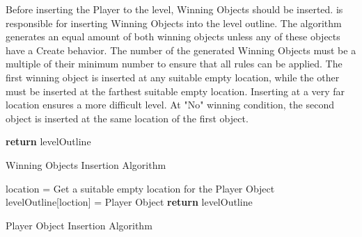 Before inserting the Player to the level, Winning Objects should be inserted.  is responsible for inserting Winning Objects into the level outline. The algorithm generates an equal amount of both winning objects unless any of these objects have a Create behavior. The number of the generated Winning Objects must be a multiple of their minimum number to ensure that all rules can be applied. The first winning object is inserted at any suitable empty location, while the other must be inserted at the farthest suitable empty location. Inserting at a very far location ensures a more difficult level. At "No" winning condition, the second object is inserted at the same location of the first object.\\

\begin{algorithm}[H]
	\BlankLine
	\BlankLine
	\BlankLine
	\textbf{return} levelOutline\;
	\caption{Winning Objects Insertion Algorithm}
	\label{Algorithm:winningObjects}
\end{algorithm}

\begin{algorithm}[H]
	\BlankLine
	location = Get a suitable empty location for the Player Object\;
	levelOutline[loction] = Player Object\;
	\BlankLine
	\textbf{return} levelOutline\;
	\caption{Player Object Insertion Algorithm}
	\label{Algorithm:playerObject}
\end{algorithm}


